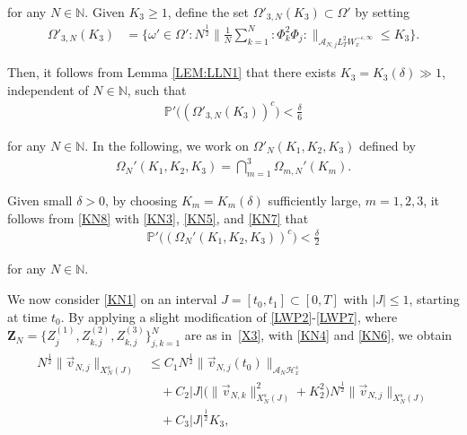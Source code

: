 \documentclass[letterpaper, 11pt,  reqno]{amsart}
\newcommand{\1}{\hspace{0.5mm}\text{I}\hspace{0.2mm}}
\newcommand{\noi}{\noindent}
\newcommand{\N}{\mathbb{N}}
\newcommand{\PP}{\mathbb{P}}
\renewcommand{\H}{\mathcal{H}}
\newcommand{\eps}{\varepsilon}
\newcommand{\dl}{\delta}
\newcommand{\A}{\mathcal{A}}
\newcommand{\wick}[1]{:\!{#1}\!:}
\renewcommand{\O}{\Omega}
\renewcommand{\o}{\omega}
\numberwithin{equation}{section}
\numberwithin{theorem}{section}
\begin{document}
\noi
for any $N \in \N$.
Given  $K_3 \ge 1$,   define 
the set $\O'_{3, N}(K_3)\subset \O'$
by setting
\begin{align}
\O'_{3, N}(K_3)
& = \Bigg\{\o' \in \O': 
N^{\frac 12}
\bigg\| \frac{1}{N} \sum_{k = 1}^N \wick{\Phi_k^2 \Phi_j} 
\bigg\|_{\A_{N, j} L_T^2 W_x^{- \eps, \infty}} \leq K_3 \Bigg\}.
\label{KN6}
\end{align}

\noi
Then, it follows from 
 Lemma \ref{LEM:LLN1}
that 
 there exists $K_3  = K_3(\dl) \gg1$, 
 independent of $N \in \N$, 
 such that 
\begin{align}
\PP'\big( (\O'_{3, N}(K_3))^c \big) < \frac \dl 6
\label{KN7}
\end{align}


\noi
for any $N \in \N$.
In the following, we work on 
$\O'_N ( K_1, K_2, K_3)$ defined by 
\begin{align}
\O_N'  ( K_1, K_2, K_3)= \bigcap_{m = 1}^3\O_{m, N}'(K_m).
\label{KN8}
\end{align}

\noi
Given small $\dl > 0$, 
by choosing 
$K_m = K_m(\dl)$ sufficiently large, $m = 1, 2, 3$, 
 it follows from 
\eqref{KN8}
with  \eqref{KN3}, \eqref{KN5},  and \eqref{KN7}
that 
\begin{align}
\PP'\big((\O_N'  ( K_1, K_2, K_3))^c\big) < \frac \dl 2
\label{KN9}
\end{align}

\noi
for any $N \in \N$.




\medskip


We now consider \eqref{KN1}
on an interval $J = [t_0, t_1] \subset [0, T]$ with $|J| \le 1$, 
 starting at time $t_0$.
By  applying a slight modification of 
\eqref{LWP2}-\eqref{LWP7}, 
where $\pmb Z_N = \big\{Z_j^{(1)},  Z_{k, j}^{(2)}, Z_{k, j}^{(3)}\big\}_{j, k = 1}^N$
are as in~\eqref{X3}, 
with  \eqref{KN4} and \eqref{KN6}, 
 we obtain
\begin{align}
\begin{split}
 N^{\frac 12 }  \|\vec v_{N, j}\|_{X^s_{N}(J)}
& 
\le 
C_1 
N^{\frac 12} \|\vec  v_{N, j} (t_0) \|_{\A_N \H^s_x} \\
& \quad 
+ C_2 |J|
\Big( \| \vec v_{N, k}\|_{X^s_{N}(J)}^2
+ K_2^2  \Big)
N^{\frac 12 } \|\vec  v_{N, j}\|_{X^s_{N}(J)}\\
& \quad 
+C_3 |J|^\frac 12 K_3, 
\end{split}
\label{KN10}
\end{align}
\end{document}
